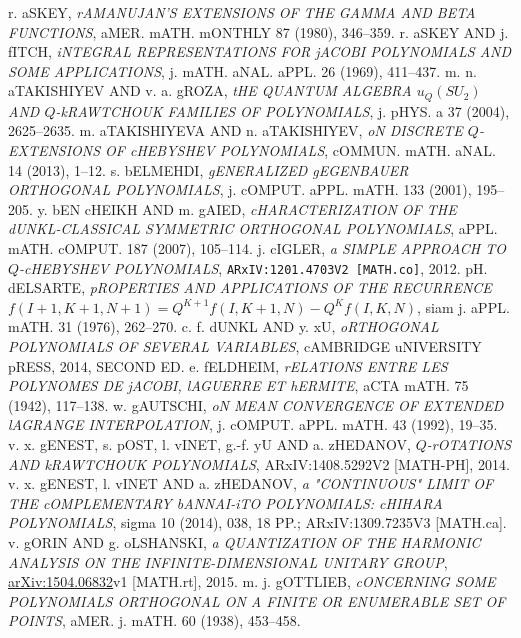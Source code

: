 \documentclass[twoside,11pt]{article}
\begin{document}
% 
\makeatletter 
\renewcommand\@biblabel[1]{[K#1]} 
\makeatother 
% 
\renewcommand{\refname}{Other REFERENCES} 
\begin{thebibliography}{999} 
\label{sec_ref3} 
% 
% 
r. aSKEY, 
{\em rAMANUJAN'S EXTENSIONS OF THE GAMMA AND BETA FUNCTIONS}, 
aMER. mATH. mONTHLY 87 (1980), 346--359. 
% 
r. aSKEY AND j. fITCH, 
{\em iNTEGRAL REPRESENTATIONS FOR jACOBI POLYNOMIALS AND SOME APPLICATIONS}, 
j. mATH. aNAL. aPPL. 26 (1969), 411--437. 
% 
m. n. aTAKISHIYEV AND v. a. gROZA, 
{\em tHE QUANTUM ALGEBRA $u_Q(SU_2)$ AND $Q$-kRAWTCHOUK FAMILIES OF 
POLYNOMIALS}, 
j. pHYS. a 37 (2004), 2625--2635. 
% 
m. aTAKISHIYEVA AND n. aTAKISHIYEV, 
{\em oN DISCRETE $Q$-EXTENSIONS OF cHEBYSHEV POLYNOMIALS}, 
cOMMUN. mATH. aNAL. 14 (2013),  1--12. 
% 
s. bELMEHDI, 
{\em gENERALIZED gEGENBAUER ORTHOGONAL POLYNOMIALS}, 
j. cOMPUT. aPPL. mATH. 133 (2001), 195--205. 
% 
y. bEN cHEIKH AND m. gAIED, 
{\em cHARACTERIZATION OF THE dUNKL-CLASSICAL SYMMETRIC ORTHOGONAL POLYNOMIALS}, 
aPPL. mATH. cOMPUT. 187 (2007), 105--114. 
% 
j. cIGLER, 
{\em a SIMPLE APPROACH TO $Q$-cHEBYSHEV POLYNOMIALS}, 
{\tt ARxIV:1201.4703V2 [MATH.co]}, 2012. 
% 
pH. dELSARTE, 
{\em pROPERTIES AND APPLICATIONS OF THE RECURRENCE 
$f(I+1,K+1,N+1)=Q^{K+1}f(I,K+1,N)-Q^{K}f(I,K,N)$}, 
siam j. aPPL. mATH. 31 (1976), 262--270. 
% 
c. f. dUNKL AND y. xU, 
{\em oRTHOGONAL POLYNOMIALS OF SEVERAL VARIABLES}, 
cAMBRIDGE uNIVERSITY pRESS, 2014, SECOND ED. 
% 
e. fELDHEIM, 
{\em rELATIONS ENTRE LES POLYNOMES DE jACOBI, lAGUERRE ET hERMITE}, 
aCTA mATH. 75 (1942), 117--138. 
% 
w. gAUTSCHI, 
{\em oN MEAN CONVERGENCE OF EXTENDED lAGRANGE INTERPOLATION}, 
j. cOMPUT. aPPL. mATH. 43 (1992), 19--35. 
% 
v. x. gENEST, s. pOST, l. vINET, g.-f. yU AND a. zHEDANOV, 
{\em $Q$-rOTATIONS AND kRAWTCHOUK POLYNOMIALS}, 
ARxIV:1408.5292V2 [MATH-PH], 2014. 
% 
v. x. gENEST, l. vINET AND a. zHEDANOV, 
{\em a "CONTINUOUS" LIMIT OF THE cOMPLEMENTARY bANNAI-iTO POLYNOMIALS: 
cHIHARA POLYNOMIALS}, 
sigma 10 (2014), 038, 18 PP.; ARxIV:1309.7235V3 [MATH.ca]. 
% 
v. gORIN AND g. oLSHANSKI, 
{\em a QUANTIZATION OF THE HARMONIC ANALYSIS ON THE INFINITE-DIMENSIONAL 
UNITARY GROUP}, 
\href{http://arxiv.org/abs/1504.06832}{arXiv:1504.06832}v1 [MATH.rt], 2015. 
% 
m. j. gOTTLIEB, 
{\em cONCERNING SOME POLYNOMIALS ORTHOGONAL ON A FINITE OR ENUMERABLE SET OF  POINTS}, 
aMER. j. mATH. 60 (1938), 453--458. 
% 

\end{thebibliography}
\end{document}
